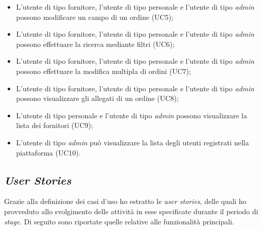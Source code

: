 \begin{itemize}
\begin{itemize}
      \item L'utente di tipo fornitore, l'utente di tipo personale e l'utente di tipo \emph{admin} possono modificare un campo di un ordine (UC5);
      \item L'utente di tipo fornitore, l'utente di tipo personale e l'utente di tipo \emph{admin} possono effettuare la ricerca mediante filtri (UC6);
      \item L'utente di tipo fornitore, l'utente di tipo personale e l'utente di tipo \emph{admin} possono effettuare la modifica multipla di ordini (UC7);
      \item L'utente di tipo fornitore, l'utente di tipo personale e l'utente di tipo \emph{admin} possono visualizzare gli allegati di un ordine (UC8);
      \item L'utente di tipo personale e l'utente di tipo \emph{admin} possono visualizzare la lista dei fornitori (UC9);
      \item L'utente di tipo \emph{admin} può visualizzare la lista degli utenti registrati nella piattaforma (UC10).
    \end{itemize}
\end{itemize}

\subsection{\emph{User Stories}}
Grazie alla definizione dei casi d'uso ho estratto le \emph{user stories}, delle quali ho provveduto allo svolgimento delle attività in esse specificate durante il periodo di \emph{stage}. 
Di seguito sono riportate quelle relative alle funzionalità principali.

